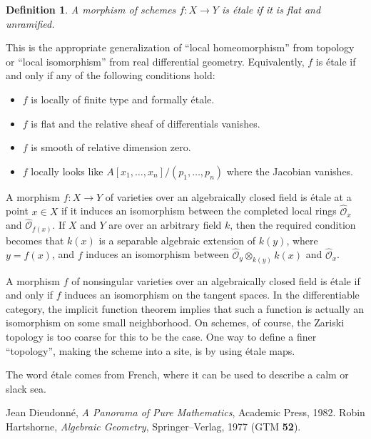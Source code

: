 \documentclass[12pt]{article}
\newtheorem{defn}{Definition}
\begin{document}
\begin{defn}
A morphism of schemes $f:X\to Y$ is \emph{\'etale} if it is flat and unramified. 
\end{defn}
This is the appropriate generalization of ``local homeomorphism'' from topology or ``local isomorphism'' from real differential geometry.
Equivalently, $f$ is \'etale if and only if any of the following conditions hold:
\begin{itemize}
\item
$f$ is locally of finite type and formally \'etale.
\item
$f$ is flat and the relative sheaf of differentials vanishes.
\item
$f$ is smooth of relative dimension zero.
\item
$f$ locally looks like $A[x_1,\ldots,x_n]/(p_1,\ldots,p_n)$ where the
Jacobian vanishes.
\end{itemize}

A morphism $f:X\to Y$ of varieties over an algebraically 
closed field is \'etale at a point $x\in X$ if it induces an 
isomorphism between the completed local rings $\widehat{\mathcal{O}}_x$
and $\widehat{\mathcal{O}}_{f(x)}$.  If $X$ and
$Y$ are over an arbitrary field $k$, then the required
condition becomes that $k(x)$ is a separable algebraic extension 
of $k(y)$, where $y=f(x)$, and $f$ induces an isomorphism between
$\widehat{\mathcal{O}}_y \otimes_{k(y)} k(x)$ and $\widehat{\mathcal{O}}_x$.

A morphism $f$ of nonsingular varieties over an algebraically closed 
field is \'etale if and only if $f$ induces an isomorphism on the tangent spaces. In the differentiable category, the implicit function theorem 
implies that such a function is actually an isomorphism on some small 
neighborhood.  On schemes, of course, the Zariski topology is too 
coarse for this to be the case.  One way to define a finer ``topology'', 
making the scheme into a site, is by using \'etale maps.

The word \'etale comes from French, where it can be used to describe a calm or slack sea.

\begin{thebibliography}{9}
 Jean Dieudonn\'{e}, {\em A Panorama of Pure Mathematics}, Academic Press, 1982.
 Robin Hartshorne, {\em Algebraic
Geometry}, Springer--Verlag, 1977 (GTM {\bf 52}).
\end{thebibliography}
\end{document}
